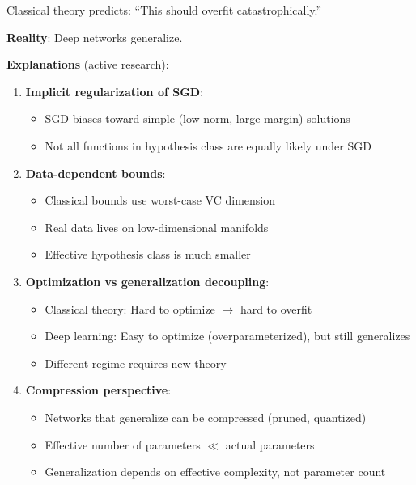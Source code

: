 \documentclass[11pt,oneside]{book}
\begin{document}
Classical theory predicts: ``This should overfit catastrophically.''

\textbf{Reality}: Deep networks generalize.

\textbf{Explanations} (active research):

\begin{enumerate}
    \item \textbf{Implicit regularization of SGD}:
    \begin{itemize}
        \item SGD biases toward simple (low-norm, large-margin) solutions
        \item Not all functions in hypothesis class are equally likely under SGD
    \end{itemize}

    \item \textbf{Data-dependent bounds}:
    \begin{itemize}
        \item Classical bounds use worst-case VC dimension
        \item Real data lives on low-dimensional manifolds
        \item Effective hypothesis class is much smaller
    \end{itemize}

    \item \textbf{Optimization vs generalization decoupling}:
    \begin{itemize}
        \item Classical theory: Hard to optimize $\rightarrow$ hard to overfit
        \item Deep learning: Easy to optimize (overparameterized), but still generalizes
        \item Different regime requires new theory
    \end{itemize}

    \item \textbf{Compression perspective}:
    \begin{itemize}
        \item Networks that generalize can be compressed (pruned, quantized)
        \item Effective number of parameters $\ll$ actual parameters
        \item Generalization depends on effective complexity, not parameter count
    \end{itemize}
\end{enumerate}
\end{document}
